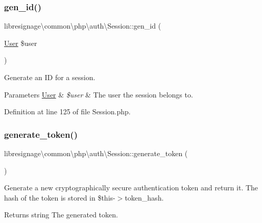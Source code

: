 \subsubsection{\texorpdfstring{gen\+\_\+id()}{gen\_id()}}
{\footnotesize\ttfamily libresignage\textbackslash{}common\textbackslash{}php\textbackslash{}auth\textbackslash{}\+Session\+::gen\+\_\+id (\begin{DoxyParamCaption}\item[{\hyperlink{classlibresignage_1_1common_1_1php_1_1auth_1_1User}{User}}]{\$user }\end{DoxyParamCaption})\hspace{0.3cm}{\ttfamily [private]}}

Generate an ID for a session.


\begin{DoxyParams}[1]{Parameters}
\hyperlink{classlibresignage_1_1common_1_1php_1_1auth_1_1User}{User} & {\em \$user} & The user the session belongs to. \\
\hline
\end{DoxyParams}


Definition at line 125 of file Session.\+php.

\mbox{\label{classlibresignage_1_1common_1_1php_1_1auth_1_1Session_a296ea2a8da96c5052145dd7ff5be5784}} 
\subsubsection{\texorpdfstring{generate\+\_\+token()}{generate\_token()}}
{\footnotesize\ttfamily libresignage\textbackslash{}common\textbackslash{}php\textbackslash{}auth\textbackslash{}\+Session\+::generate\+\_\+token (\begin{DoxyParamCaption}{ }\end{DoxyParamCaption})\hspace{0.3cm}{\ttfamily [private]}}

Generate a new cryptographically secure authentication token and return it. The hash of the token is stored in \$this-\/$>$token\+\_\+hash.

\begin{DoxyReturn}{Returns}
string The generated token.
\end{DoxyReturn}

